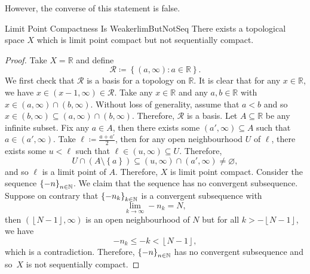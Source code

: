 \documentclass[math]{amznotes}
\theoremstyle{remark}
\begin{document}
However, the converse of this statement is false.
\begin{probox}{Limit Point Compactness Is Weaker}{limButNotSeq}
    There exists a topological space $X$ which is limit point compact but not sequentially compact.
    \tcblower
    \begin{proof}
        Take $X = \mathbb{R}$ and define
        \begin{equation*}
            \mathcal{R} \coloneqq \left\{\left(a, \infty\right) \colon a \in \mathbb{R}\right\}.
        \end{equation*}
        We first check that $\mathcal{R}$ is a basis for a topology on $\mathbb{R}$. It is clear that for any $x \in \mathbb{R}$, we have $x \in \left(x - 1, \infty\right) \in \mathcal{R}$. Take any $x \in \mathbb{R}$ and any $a, b \in \mathbb{R}$ with $x \in \left(a, \infty\right) \cap \left(b, \infty\right)$. Without loss of generality, assume that $a < b$ and so $x \in \left(b, \infty\right) \subseteq \left(a, \infty\right) \cap \left(b, \infty\right)$. Therefore, $\mathcal{R}$ is a basis. Let $A \subseteq \mathbb{R}$ be any infinite subset. Fix any $a \in A$, then there exists some $\left(a', \infty\right) \subseteq A$ such that $a \in \left(a', \infty\right)$. Take $\ell \coloneqq \frac{a + a'}{2}$, then for any open neighbourhood $U$ of $\ell$, there exists some $u < \ell$ such that $\ell \in \left(u, \infty\right) \subseteq U$. Therefore, 
        \begin{equation*}
            U \cap \left(A \setminus \left\{a\right\}\right) \subseteq \left(u, \infty\right) \cap \left(a', \infty\right) \neq \varnothing,
        \end{equation*}
        and so $\ell$ is a limit point of $A$. Therefore, $X$ is limit point compact. Consider the sequence $\left\{-n\right\}_{n \in \mathbb{N}}$. We claim that the sequence has no convergent subsequence. Suppose on contrary that $\left\{-n_k\right\}_{k \in \mathbb{N}}$ is a convergent subsequence with 
        \begin{equation*}
            \lim_{k \to \infty}-n_k = N,
        \end{equation*}
        then $\left(\left\lfloor N - 1 \right\rfloor, \infty\right)$ is an open neighbourhood of $N$ but for all $k > -\left\lfloor N - 1 \right\rfloor$, we have 
        \begin{equation*}
            -n_k \leq -k < \left\lfloor N - 1 \right\rfloor,
        \end{equation*}
        which is a contradiction. Therefore, $\left\{-n\right\}_{n \in \mathbb{N}}$ has no convergent subsequence and so~$X$ is not sequentially compact.
    \end{proof}
\end{probox}
\end{document}
